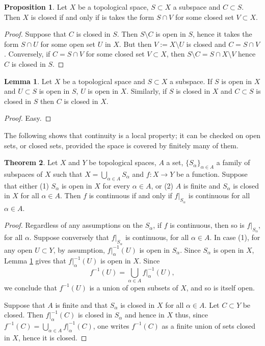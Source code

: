 \documentclass{book}
\theoremstyle{definition}
\newtheorem{theorem}{Theorem}[section]
\newtheorem{proposition}{Proposition}[section]
\newtheorem{lemma}[theorem]{Lemma}
\theoremstyle{remark}
\begin{document}
\begin{proposition}
Let $X$ be a topological space, $S\subset X$ a subspace and $C\subset S$. Then $X$ is closed if and only if is takes the form $S\cap V$ for some closed set $V\subset X$.
\end{proposition}
\begin{proof}
Suppose that $C$ is closed in $S$. Then $S\setminus C$ is open in $S$, hence it takes the form $S\cap U$ for some open set $U$ in $X$. But then $V:=X\setminus U$ is closed and $C=S\cap V$. Conversely, if $C=S\cap V$ for some closed set $V\subset X$, then $S\setminus C=S\cap X\setminus V$ hence $C$ is closed in $S$.
\end{proof}

\begin{lemma}\label{open subset of open subspace}
Let $X$ be a topological space and $S\subset X$ a subspace. If $S$ is open in $X$ and $U\subset S$ is open in $S$, $U$ is open in $X$. Similarly, if $S$ is closed in $X$ and $C\subset S$ is closed in $S$ then $C$ is closed in $X$.
\end{lemma}
\begin{proof}
Easy.
\end{proof}

The following shows that continuity is a local property; it can be checked on open sets, or closed sets, provided the space is covered by finitely many of them.

\begin{theorem}
\label{continuousonsubspaces}
Let $X$ and $Y$ be topological spaces, $A$ a set, $\{S_\alpha\}_{\alpha\in A}$ a family of subspaces of $X$ such that $X=\bigcup_{\alpha\in A}S_\alpha$ and $f:X\to Y$ be a function. Suppose that either (1) $S_\alpha$ is open in $X$ for every $\alpha\in A$, or (2) $A$ is finite and $S_\alpha$ is closed in $X$ for all $\alpha\in A$. Then $f$ is continuous if and only if $f|_{S_\alpha}$ is continuous for all $\alpha\in A$.
\end{theorem}
\begin{proof}
Regardless of any assumptions on the $S_\alpha$, if $f$ is continuous, then so is $f|_{S_\alpha}$, for all $\alpha$. Suppose conversely that $f|_{S_\alpha}$ is continuous, for all $\alpha\in A$. In case (1), for any open $U\subset Y$, by assumption, $f|_\alpha^{-1}(U)$ is open in $S_\alpha$. Since $S_\alpha$ is open in $X$, Lemma \ref{open subset of open subspace} gives that $f|_\alpha^{-1}(U)$ is open in $X$. Since
$$f^{-1}(U)=\bigcup_{\alpha\in A}f|_\alpha^{-1}(U),$$
we conclude that $f^{-1}(U)$ is a union of open subsets of $X$, and so is itself open.

Suppose that $A$ is finite and that $S_\alpha$ is closed in $X$ for all $\alpha\in A$. Let $C\subset Y$ be closed. Then $f|_\alpha^{-1}(C)$ is closed in $S_\alpha$ and hence in $X$ thus, since $f^{-1}(C)=\bigcup_{\alpha\in A}f|_\alpha^{-1}(C)$, one writes $f^{-1}(C)$ as a finite union of sets closed in $X$, hence it is closed.
\end{proof}
\end{document}
